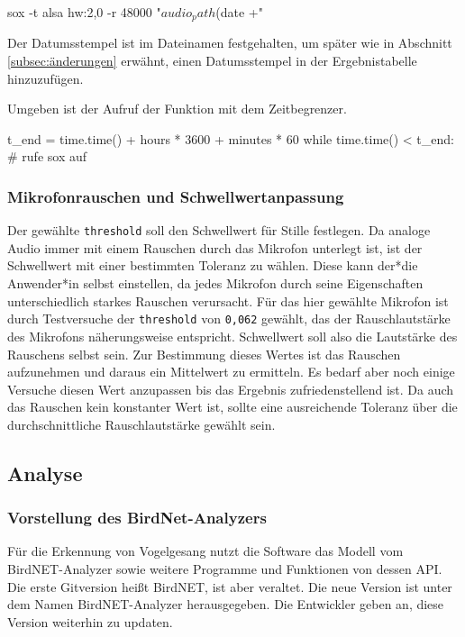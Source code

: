 \begin{bash}[frame=shadowbox]
    sox -t alsa hw:2,0 -r 48000 "$audio_path$(date +"%
\end{bash}


Der Datumsstempel ist im Dateinamen festgehalten, um später wie in Abschnitt \ref{subsec:änderungen} erwähnt, einen Datumsstempel in der Ergebnistabelle hinzuzufügen.

Umgeben ist der Aufruf der Funktion mit dem Zeitbegrenzer.

\begin{python}
    t_end = time.time() + hours * 3600 + minutes * 60
    while time.time() < t_end: 
        # rufe sox auf    
\end{python}


\subsubsection{Mikrofonrauschen und Schwellwertanpassung}
\label{subsubsec:mikrofonrauschen}
Der gewählte \texttt{threshold} soll den Schwellwert für Stille festlegen. Da analoge Audio immer mit einem Rauschen durch das Mikrofon unterlegt ist, ist der Schwellwert mit einer bestimmten Toleranz zu wählen. Diese kann der*die Anwender*in selbst einstellen, da jedes Mikrofon durch seine Eigenschaften unterschiedlich starkes Rauschen verursacht. Für das hier gewählte Mikrofon ist durch Testversuche der \texttt{threshold} von \texttt{0,062} gewählt, das der Rauschlautstärke des Mikrofons näherungsweise entspricht. Schwellwert soll also die Lautstärke des Rauschens selbst sein.
Zur Bestimmung dieses Wertes ist das Rauschen aufzunehmen und daraus ein Mittelwert zu ermitteln. Es bedarf aber noch einige Versuche diesen Wert anzupassen bis das Ergebnis zufriedenstellend ist. Da auch das Rauschen kein konstanter Wert ist, sollte eine ausreichende Toleranz über die durchschnittliche Rauschlautstärke gewählt sein.

\subsection{Analyse}


\subsubsection{Vorstellung des BirdNet-Analyzers}
\label{subsubsec:vorstellung}

Für die Erkennung von Vogelgesang nutzt die Software das Modell vom BirdNET-Analyzer \cite{kahl2021birdnet} sowie weitere Programme und Funktionen von dessen API. Die erste Gitversion heißt BirdNET, ist aber veraltet. Die neue Version ist unter dem Namen BirdNET-Analyzer herausgegeben. Die Entwickler geben an, diese Version weiterhin zu updaten.

